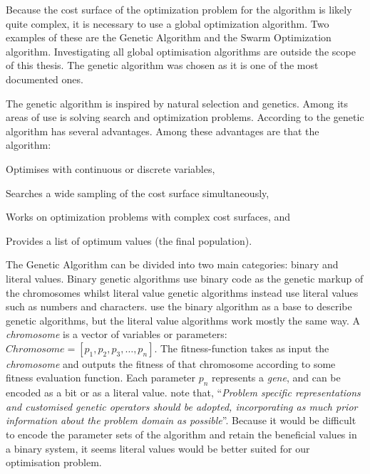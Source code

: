 Because the cost surface of the optimization problem for the \CTC algorithm is likely quite complex, it is necessary to use a global optimization algorithm. Two examples of these are the Genetic Algorithm and the Swarm Optimization algorithm. Investigating all global optimisation algorithms are outside the scope of this thesis. The genetic algorithm was chosen as it is one of the most documented ones.

The genetic algorithm is inspired by natural selection and genetics. Among its areas of use is solving search and optimization problems. According to \citeauthor{Haupt2004} the genetic algorithm has several advantages. Among these advantages are that the algorithm:
\begin{inparaenum}[\itshape 1\upshape)]
\item Optimises with continuous or discrete variables,
\item Searches a wide sampling of the cost surface simultaneously,
\item Works on optimization problems with complex cost surfaces, and
\item Provides a list of optimum values (the final population).
\end{inparaenum}

The Genetic Algorithm can be divided into two main categories: binary and literal values. Binary genetic algorithms use binary code as the genetic markup of the chromosomes whilst literal value genetic algorithms instead use literal values such as numbers and characters. \citeauthor{Haupt2004a} use the binary algorithm as a base to describe genetic algorithms, but the literal value algorithms work mostly the same way. A \textit{chromosome} is a vector of variables or parameters: \(Chromosome = [p_{1},p_{2},p_{3},\dots,p_{n}]\). The fitness-function takes as input the \textit{chromosome} and outputs the fitness of that chromosome according to some fitness evaluation function. Each parameter \(p_{n}\) represents a \textit{gene}, and can be encoded as a bit or as a literal value. \citeauthor[p. 93]{Brownlee2011} note that, ``\textit{Problem specific representations and customised genetic operators should be adopted, incorporating as much prior information about the problem domain as possible}''. Because it would be difficult to encode the parameter sets of the \CTC algorithm and retain the beneficial values in a binary system, it seems literal values would be better suited for our optimisation problem.


